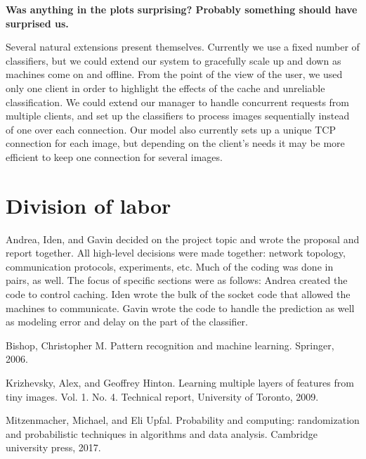 \documentclass[12pt]{article}
\begin{document}
{\bf Was anything in the plots surprising?
Probably something should have surprised us.}

Several natural extensions present themselves.
Currently we use a fixed number of classifiers, but we could extend our system to gracefully scale up and down as machines come on and offline.
From the point of the view of the user, we used only one client in order to highlight the effects of the cache and unreliable classification.
We could extend our manager to handle concurrent requests from multiple clients, and set up the classifiers to process images sequentially instead of one over each connection.
Our model also currently sets up a unique TCP connection for each image, but depending on the client's needs it may be more efficient to keep one connection for several images.

\section{Division of labor}

Andrea, Iden, and Gavin decided on the project topic and wrote the proposal and report together.
All high-level decisions were made together: network topology, communication protocols, experiments, etc.
Much of the coding was done in pairs, as well.
The focus of specific sections were as follows: Andrea created the code to control caching.
Iden wrote the bulk of the socket code that allowed the machines to communicate.
Gavin wrote the code to handle the prediction as well as modeling error and delay on the part of the classifier.


\footnotesize\begin{thebibliography}{1}
    Bishop, Christopher M. Pattern recognition and machine learning. Springer, 2006.

    Krizhevsky, Alex, and Geoffrey Hinton. Learning multiple layers of features from tiny images. Vol. 1. No. 4. Technical report, University of Toronto, 2009.

    Mitzenmacher, Michael, and Eli Upfal. Probability and computing: randomization and probabilistic techniques in algorithms and data analysis. Cambridge university press, 2017.

\end{thebibliography}
\end{document}
